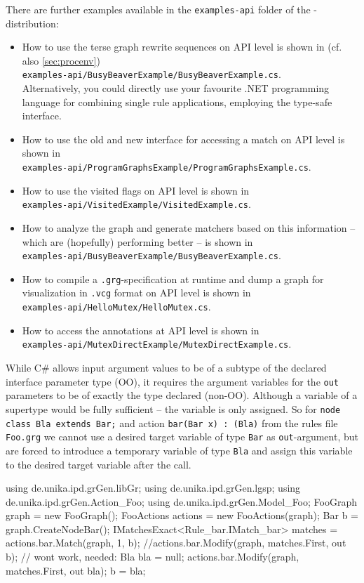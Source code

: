 There are further examples available in the \texttt{examples-api} folder of the \GrG-distribution:
\begin{itemize} 
\item How to use the terse graph rewrite sequences on API level is shown in (cf. also \ref{sec:procenv})\\
\texttt{examples-api/BusyBeaverExample/BusyBeaverExample.cs}.\\
Alternatively, you could directly use your favourite .NET programming language for combining single rule applications, employing the type-safe interface.
\item How to use the old and new interface for accessing a match on API level is shown in\\
\texttt{examples-api/ProgramGraphsExample/ProgramGraphsExample.cs}.
\item How to use the visited\label{apiallocvisitflag} flags on API level is shown in\\
\texttt{examples-api/VisitedExample/VisitedExample.cs}.
\item How to analyze the graph and generate matchers based on this information -- which are (hopefully) performing better -- is shown in\\
\texttt{examples-api/BusyBeaverExample/BusyBeaverExample.cs}.
\item How to compile a \texttt{.grg}-specification at runtime and dump a graph for visualization in \texttt{.vcg} format on API level is shown in\\
\texttt{examples-api/HelloMutex/HelloMutex.cs}.
\item How to access the annotations at API level is shown in\\
\texttt{examples-api/MutexDirectExample/MutexDirectExample.cs}.
\end{itemize}

\begin{warning}
While C\# allows input argument values to be of a subtype of the declared interface parameter type (OO), 
it requires the argument variables for the \texttt{out} parameters to be of exactly the type declared (non-OO).
Although a variable of a supertype would be fully sufficient -- the variable is only assigned.
So for \texttt{node class Bla extends Bar;} and action \texttt{bar(Bar x) : (Bla)} from the rules file \texttt{Foo.grg}
we cannot use a desired target variable of type \texttt{Bar} as \texttt{out}-argument,
but are forced to introduce a temporary variable of type \texttt{Bla}
and assign this variable to the desired target variable after the call.
\begin{csharplet}
using de.unika.ipd.grGen.libGr;
using de.unika.ipd.grGen.lgsp;
using de.unika.ipd.grGen.Action_Foo;
using de.unika.ipd.grGen.Model_Foo;
FooGraph graph = new FooGraph();
FooActions actions = new FooActions(graph);
Bar b = graph.CreateNodeBar();
IMatchesExact<Rule_bar.IMatch_bar> matches = actions.bar.Match(graph, 1, b);
//actions.bar.Modify(graph, matches.First, out b); // wont work, needed:
Bla bla = null; 
actions.bar.Modify(graph, matches.First, out bla);
b = bla;
\end{csharplet}
\end{warning}


